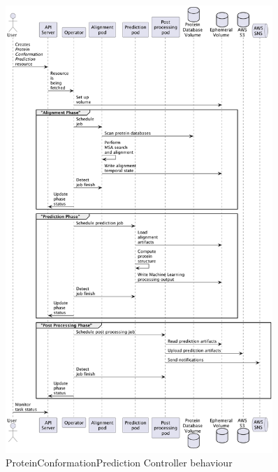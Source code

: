 \begin{figure}[htbp]
    \centering
    \includegraphics[width=0.9\textwidth]{images/proteinconformationprediction_controller}
    \caption{ProteinConformationPrediction Controller behaviour}
    \label{fig:proteinconformationprediction_controller}
\end{figure}

